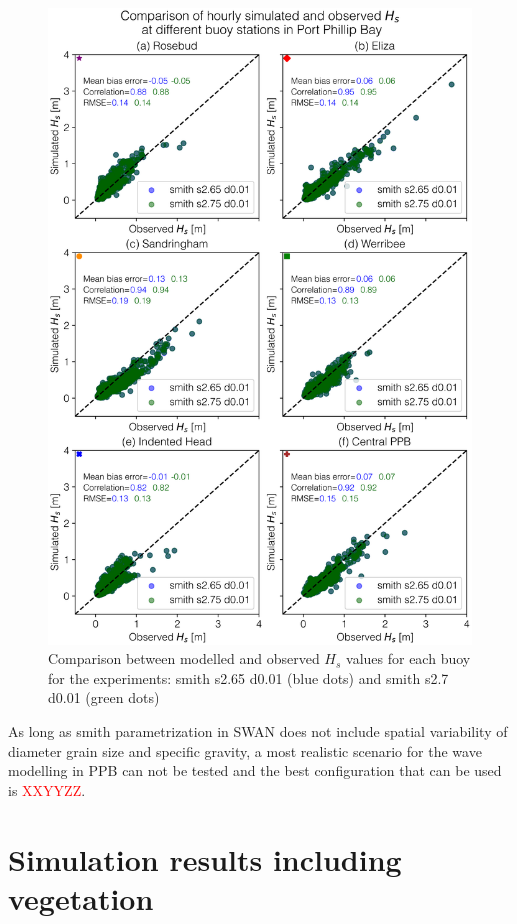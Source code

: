 \documentclass[12pt]{article}
\begin{document}
\begin{figure}[H]
    \centering
    \includegraphics[scale=0.7]{plots/scatter/smith s2.65 d0.01_vs_smith s2.75 d0.01_vert_sca.png}
    \caption{Comparison between modelled and observed $H_{s}$ values for each buoy for the experiments: smith s2.65 d0.01 (blue dots) and smith s2.7 d0.01 (green dots)}
    \label{fig:scatter_smith_s2.65_vs_smith_s2.75}
\end{figure}

As long as smith parametrization in SWAN does not include spatial variability of diameter grain size and specific gravity, a most realistic scenario for the wave modelling in PPB can not be tested and the best configuration that can be used is \textcolor{red}{XXYYZZ}. 

\section{Simulation results including vegetation}
\end{document}
